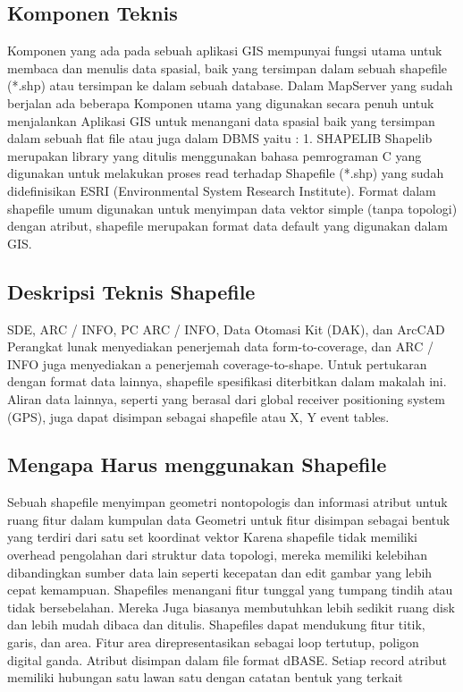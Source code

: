 \subsection{Komponen Teknis}
Komponen yang ada pada sebuah aplikasi GIS
mempunyai fungsi utama untuk membaca dan menulis
data spasial, baik yang tersimpan dalam sebuah
shapefile (*.shp) atau tersimpan ke dalam sebuah
database.
Dalam MapServer yang sudah berjalan ada beberapa
Komponen utama yang digunakan secara penuh untuk
menjalankan Aplikasi GIS untuk menangani data
spasial baik yang tersimpan dalam sebuah flat file atau
juga dalam DBMS yaitu :
1. SHAPELIB
Shapelib merupakan library yang ditulis
menggunakan bahasa pemrograman C yang
digunakan untuk melakukan proses read terhadap
Shapefile (*.shp) yang sudah didefinisikan ESRI
(Environmental System Research Institute).
Format dalam shapefile umum digunakan untuk
menyimpan data vektor simple (tanpa topologi)
dengan atribut, shapefile merupakan format data
default yang digunakan dalam GIS.

\subsection{Deskripsi Teknis Shapefile}
SDE, ARC / INFO, PC ARC / INFO, Data Otomasi Kit (DAK), dan ArcCAD
Perangkat lunak menyediakan penerjemah data form-to-coverage, dan ARC / INFO juga menyediakan a 
penerjemah coverage-to-shape. Untuk pertukaran dengan format data lainnya, shapefile 
spesifikasi diterbitkan dalam makalah ini. Aliran data lainnya, seperti yang berasal dari global 
receiver positioning system (GPS), juga dapat disimpan sebagai shapefile atau X, Y event tables. 

\subsection{Mengapa Harus menggunakan Shapefile}
Sebuah shapefile menyimpan geometri nontopologis dan informasi atribut untuk ruang 
fitur dalam kumpulan data Geometri untuk fitur disimpan sebagai bentuk yang terdiri dari satu set 
koordinat vektor 
Karena shapefile tidak memiliki overhead pengolahan dari struktur data topologi, 
mereka memiliki kelebihan dibandingkan sumber data lain seperti kecepatan dan edit gambar yang lebih cepat 
kemampuan. Shapefiles menangani fitur tunggal yang tumpang tindih atau tidak bersebelahan. Mereka 
Juga biasanya membutuhkan lebih sedikit ruang disk dan lebih mudah dibaca dan ditulis. 
Shapefiles dapat mendukung fitur titik, garis, dan area. Fitur area direpresentasikan sebagai 
loop tertutup, poligon digital ganda. Atribut disimpan dalam file format dBASE. 
Setiap record atribut memiliki hubungan satu lawan satu dengan catatan bentuk yang terkait

